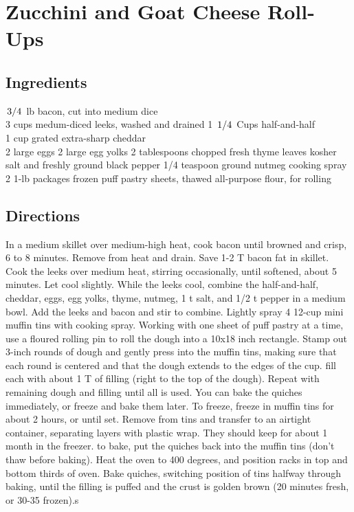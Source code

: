 \documentclass{article}
\newcounter{qcounter}
\begin{document}
\newcommand{\slfrac}[2]{\left.#1\middle/#2\right.}
\newcommand{\degree}{\ensuremath{^\circ}}

\section*{Zucchini and Goat Cheese Roll-Ups}



\subsection*{Ingredients}
$\slfrac{3}{4}$ lb bacon, cut into medium dice\\
3 cups medum-diced leeks, washed and drained
1 $\slfrac{1}{4}$ Cups half-and-half\\
1 cup grated extra-sharp cheddar\\
2 large eggs
2 large egg yolks
2 tablespoons chopped fresh thyme leaves
kosher salt and freshly ground black pepper
1/4 teaspoon ground nutmeg
cooking spray
2 1-lb packages frozen puff pastry sheets, thawed
all-purpose flour, for rolling

\subsection*{Directions}
\begin{list}{:~}{}
\item In a medium skillet over medium-high heat, cook bacon until browned and crisp, 6 to 8 minutes. Remove from heat and drain. Save 1-2 T bacon fat in skillet.  Cook the leeks over medium heat, stirring occasionally, until softened, about 5 minutes.  Let cool slightly.  While the leeks cool, combine the half-and-half, cheddar, eggs, egg yolks, thyme, nutmeg, 1 t salt, and 1/2 t pepper in a  medium bowl. Add the leeks and bacon and stir to combine. Lightly spray 4 12-cup mini muffin tins with cooking spray.  Working with one sheet of puff pastry at a time, use a floured rolling pin to roll the dough into a 10x18 inch rectangle. Stamp out 3-inch rounds of dough and gently press into the muffin tins, making sure that each round is centered and that the dough extends to the edges of the cup.  fill each with about 1 T of filling (right to the top of the dough). Repeat with remaining dough and filling until all is used.  You can bake the quiches immediately, or freeze and bake them later.  To freeze, freeze in muffin tins for about 2 hours, or until set. Remove from tins and transfer to an airtight container, separating layers with plastic wrap.  They should keep for about 1 month in the freezer.  to bake, put the quiches back into the muffin tins (don't thaw before baking). Heat the oven to 400 degrees, and position racks in top and bottom thirds of oven.  Bake quiches, switching position of tins halfway through baking, until the filling is puffed and the crust is golden brown (20 minutes fresh, or 30-35 frozen).s
\end{list}
\end{document}
